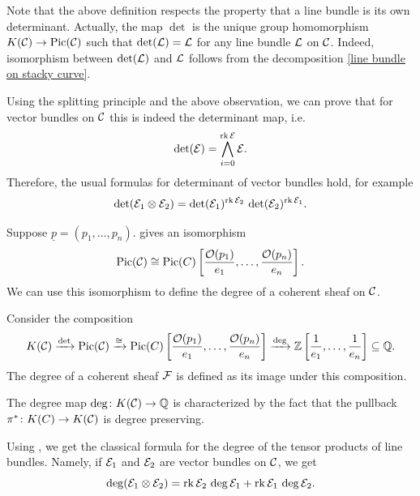 \begin{rmk}
Note that the above definition respects the property that a line bundle is its own determinant. Actually, the map $\det$ is the unique group homomorphism $K(\mathcal{C}) \to \operatorname{Pic}(\mathcal{C})$ such that $\det(\mathcal{L}) = \mathcal{L}$ for any line bundle $\mathcal{L}$ on $\mathcal{C}$. Indeed, isomorphism  between $\det(\mathcal{L})$ and $\mathcal{L}$ follows from the decomposition \eqref{line bundle on stacky curve}.
\end{rmk}

\begin{rmk}\label{det = determinant}
Using the splitting principle and the above observation, we can prove that for vector bundles on $\mathcal{C}$ this is indeed the determinant map, i.e. 
\[
\det(\mathcal{E}) = \bigwedge_{i=0}^{\operatorname{rk} \mathcal{E}} \mathcal{E}.
\]
Therefore, the usual formulas for determinant of vector bundles hold, for example
\begin{equation} \label{eq: det of tensor product}
\det(\mathcal{E}_1 \otimes \mathcal{E}_2) = \det(\mathcal{E}_1)^{\operatorname{rk} \mathcal{E}_2} \, \det(\mathcal{E}_2)^{\operatorname{rk} \mathcal{E}_1}.
\end{equation}
\end{rmk}

\begin{rmk}
Suppose $\underline{p} = (p_1, \dots , p_n)$.  gives an isomorphism
\[
\operatorname{Pic}(\mathcal{C}) \cong \operatorname{Pic}(C)\left[ \frac{\mathcal{O}(p_1)}{e_1}, \dots , \frac{\mathcal{O}(p_n)}{e_n} \right].
\]
We can use this isomorphism to define the degree of a coherent sheaf on $\mathcal{C}$.
\end{rmk}

\begin{defi}\cite[Definition 1.2.29]{Taams}
Consider the composition
\[
K(\mathcal{C}) \xrightarrow{\det} \operatorname{Pic}(\mathcal{C}) \xrightarrow{\cong} \operatorname{Pic}(C)\left[ \frac{\mathcal{O}(p_1)}{e_1}, \dots , \frac{\mathcal{O}(p_n)}{e_n} \right] \xrightarrow{\deg} \mathbb{Z}\left[ \frac{1}{e_1}, \dots , \frac{1}{e_n} \right] \subseteq \mathbb{Q}.
\]
The degree of a coherent sheaf $\mathcal{F}$ is defined as its image under this composition.
\end{defi}

\begin{rmk} \label{pullback preserves degree}
The degree map $\deg\colon K(\mathcal{C}) \to \mathbb{Q}$ is characterized by the fact that the pullback $\pi^* \colon K(C) \to K(\mathcal{C})$ is degree preserving.
\end{rmk}

\begin{rmk} \label{degree of tensor product}
Using , we get the classical formula for the degree of the tensor products of line bundles. Namely, if $\mathcal{E}_1$ and $\mathcal{E}_2$ are vector bundles on $\mathcal{C}$, we get
\begin{equation}
\deg(\mathcal{E}_1 \otimes \mathcal{E}_2) = \operatorname{rk} \mathcal{E}_2 \, \deg \mathcal{E}_1 + \operatorname{rk} \mathcal{E}_1 \, \deg \mathcal{E}_2.
\end{equation}
\end{rmk}

